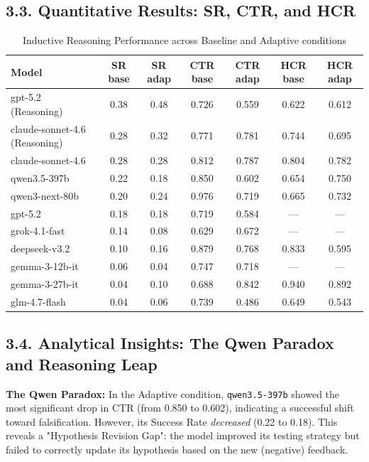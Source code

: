 \subsection*{3.3. Quantitative Results: SR, CTR, and HCR}

\begin{table}[h!]
\centering
\caption{Inductive Reasoning Performance across Baseline and Adaptive conditions}
\label{tab:246_full_data}
\begin{tabular}{lcccccc}
\toprule
\textbf{Model} & \textbf{SR base} & \textbf{SR adap} & \textbf{CTR base} & \textbf{CTR adap} & \textbf{HCR base} & \textbf{HCR adap} \\ 
\midrule
gpt-5.2 (Reasoning) & 0.38 & 0.48 & 0.726 & 0.559 & 0.622 & 0.612 \\
claude-sonnet-4.6 (Reasoning) & 0.28 & 0.32 & 0.771 & 0.781 & 0.744 & 0.695 \\
claude-sonnet-4.6   & 0.28 & 0.28 & 0.812 & 0.787 & 0.804 & 0.782 \\
qwen3.5-397b        & 0.22 & 0.18 & 0.850 & 0.602 & 0.654 & 0.750 \\
qwen3-next-80b      & 0.20 & 0.24 & 0.976 & 0.719 & 0.665 & 0.732 \\
gpt-5.2             & 0.18 & 0.18 & 0.719 & 0.584 & ---   & ---   \\
grok-4.1-fast       & 0.14 & 0.08 & 0.629 & 0.672 & ---   & ---   \\
deepseek-v3.2       & 0.10 & 0.16 & 0.879 & 0.768 & 0.833 & 0.595 \\
gemma-3-12b-it      & 0.06 & 0.04 & 0.747 & 0.718 & ---   & ---   \\
gemma-3-27b-it      & 0.04 & 0.10 & 0.688 & 0.842 & 0.940 & 0.892 \\
glm-4.7-flash       & 0.04 & 0.06 & 0.739 & 0.486 & 0.649 & 0.543 \\
\bottomrule
\end{tabular}
\end{table}

\subsection*{3.4. Analytical Insights: The Qwen Paradox and Reasoning Leap}
\textbf{The Qwen Paradox:} In the Adaptive condition, \texttt{qwen3.5-397b} showed the most significant drop in CTR (from 0.850 to 0.602), indicating a successful shift toward falsification. However, its Success Rate \textit{decreased} (0.22 to 0.18). This reveals a "Hypothesis Revision Gap": the model improved its testing strategy but failed to correctly update its hypothesis based on the new (negative) feedback.

